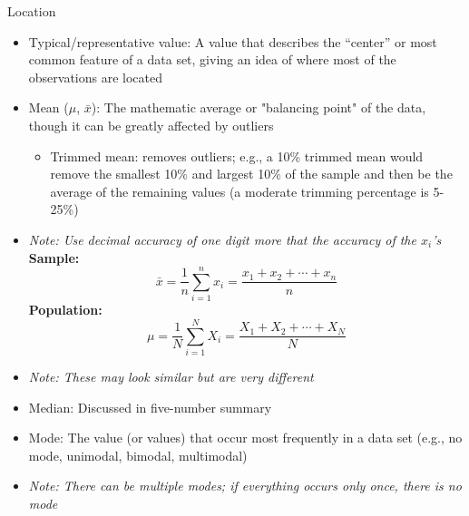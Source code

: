 \documentclass[12pt]{article}
\begin{document}
    \begin{description}
        \item[Location]
    \end{description}
    \begin{itemize}
        \item Typical/representative value: A value that describes the “center” or most common feature of a data set, giving an idea of where most of the observations are located
        \item Mean ($\mu$, $\bar{x}$): The mathematic average or "balancing point" of the data, though it can be greatly affected by outliers
        \begin{itemize}
            \item Trimmed mean: removes outliers; e.g., a 10\% trimmed mean would remove the smallest 10\% and largest 10\% of the sample and then be the average of the remaining values (a moderate trimming percentage is 5-25\%)
        \end{itemize}
        \item[] \textit{Note: Use decimal accuracy of one digit more that the accuracy of the $x_i$'s} \\
        \textbf{Sample:}
        \[
        \bar{x} = \frac{1}{n} \sum_{i=1}^{n} x_i = \frac{x_1 + x_2 + \cdots + x_n}{n}
        \]
        \textbf{Population:}
        \[
        \mu = \frac{1}{N} \sum_{i=1}^{N} X_i = \frac{X_1 + X_2 + \cdots + X_N}{N} 
        \]
        \item[] \textit{Note: These may look similar but are very different}
        \item Median: Discussed in five-number summary 
        \item Mode: The value (or values) that occur most frequently in a data set (e.g., no mode, unimodal, bimodal, multimodal)
        \item[] \textit{Note: There can be multiple modes; if everything occurs only once, there is no mode} 
    \end{itemize}
    
\end{document}
